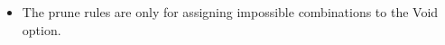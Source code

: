 \begin{itemize}
\item The prune rules are only for assigning impossible combinations to the Void option.
\end{itemize}
